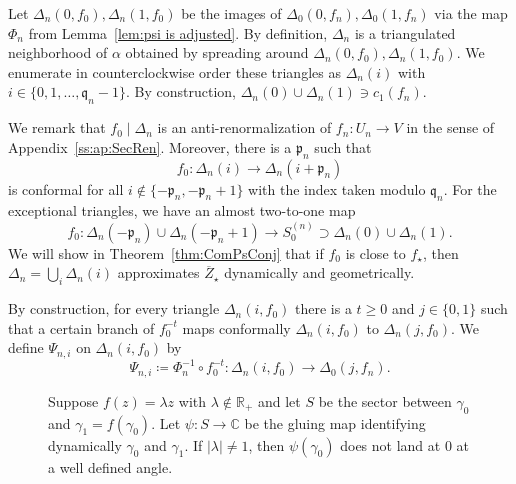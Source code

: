 \documentclass[]{amsart}
\newcommand{\bDelta}{{\mathbb{\Delta}}}
\newcommand{\str}{{\star}}
\newcommand{\pp}{\mathfrak{p}}
\renewcommand{\qq}{\mathfrak{q}}
\newcommand{\C}{\mathbb{C}}
\newcommand{\R}{\mathbb{R}}
\theoremstyle{remark}
\numberwithin{equation}{section}
\theoremstyle{definition}
\begin{document}
 Let $\Delta_n(0,f_0), \Delta_n(1,f_0)$ be the images of $\Delta_0(0,f_n), \Delta_0(1,f_n)$ via the map $\Phi_{n}$ from Lemma~\ref{lem:psi is adjusted}. By definition, $\bDelta_n$ is a triangulated neighborhood of  $\alpha$ obtained by spreading around $\Delta_n(0,f_0), \Delta_n(1,f_0)$. We enumerate in counterclockwise order these triangles as $\Delta_n(i)$ with $i\in \{0,1,\dots, \qq_n-1\}$. By construction, $\Delta_n(0)\cup \Delta_n(1)\ni c_1(f_n)$.



We remark that $f_0\mid \bDelta_n$ is an anti-renormalization of $f_n\colon U_n\to V$ in the sense of Appendix~\ref{ss:ap:SecRen}. Moreover, there is a $\pp_n$ such that \begin{equation}
 \label{eq:f_0 resp triangl}
 f_0\colon  \Delta_n(i)\to\Delta_n(i+\pp_n)
 \end{equation}
is conformal for all $i\not\in \{-\pp_n, -\pp_n+1 \}$ with the index taken modulo $\qq_n$. For the exceptional triangles, we have an almost two-to-one map  \begin{equation}
 \label{eq:f_0 viol triangl}f_0\colon \Delta_n(-\pp_n)\cup \Delta_n(-\pp_n+1) \to S_0^{(n)}\supset \Delta_n(0)\cup \Delta_n(1).
 \end{equation} 
We will show in Theorem~\ref{thm:ComPsConj} that if $f_0$ is close to $f_\str$, then $\displaystyle{\bDelta_n= \bigcup_i \Delta_n(i)}$ approximates $\overline Z_\str$ dynamically and geometrically.

By construction, for every triangle $\Delta_n(i,f_0)$ there is a $t\ge 0$ and $j\in \{0,1\}$ such that a certain branch of $f^{-t}_0$ maps conformally $\Delta_n(i,f_0)$ to $\Delta_n(j,f_0)$. We define $\Psi_{n,i}$ on $\Delta_n(i,f_0)$ by
\begin{equation}
\label{eq:PsiDefn}
 \Psi_{n,i} \coloneqq \Phi_{n}^{-1}\circ f_0^{-t} \colon \Delta_n(i, f_0)\to \Delta_0(j,f_n). 
\end{equation}



\begin{figure}
 \caption{Suppose $f(z)=\lambda z$ with $\lambda\not \in \R_{+}$ and let $S$ be the sector between $ \gamma_0$ and $\gamma_1=f(\gamma_0)$. Let $\psi \colon S\to \C$ be the gluing map identifying dynamically $\gamma_0$ and $\gamma_1$. If $|\lambda|\not=1$, then $\psi(\gamma_0)$ does not land at $0$ at a well defined angle.}
 \label{Fig:SpirAt0}
\end{figure}
\end{document}
